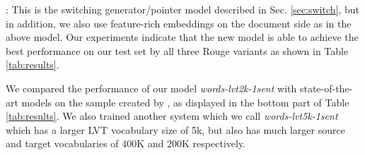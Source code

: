 : This is the switching generator/pointer model described in Sec. \ref{sec:switch}, but in addition, we also use feature-rich embeddings on the document side as in the above model.
Our experiments indicate that the new model is able to achieve the best performance on our test set by all three Rouge variants as shown in Table \ref{tab:results}.


We compared the performance of our model {\it words-lvt2k-1sent} with state-of-the-art models on the sample created by , as displayed in the bottom part of Table \ref{tab:results}. We also trained another system which we call {\it words-lvt5k-1sent} which has a larger LVT vocabulary size of 5k, but also has much larger source and target vocabularies of 400K and 200K respectively.

